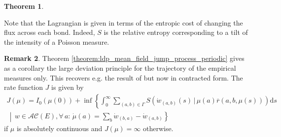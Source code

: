 \documentclass[a4paper]{article}
\newcommand{\cA}{\mathcal{A}}
\newcommand{\cC}{\mathcal{C}}
\newcommand{\cL}{\mathcal{L}}
\newcommand{\bR}{\mathbb{R}}
\newcommand{\dd}{ \mathrm{d}}
\numberwithin{equation}{section}
\newtheorem{theorem}{Theorem}[section]
\theoremstyle{definition}
\newtheorem{remark}[theorem]{Remark}
\begin{document}
\begin{theorem}
\end{theorem}


Note that the Lagrangian is given in terms of the entropic cost of changing the flux across each bond. Indeed, $S$ is the relative entropy corresponding to a tilt of the intensity of a Poisson measure. 

\smallskip


\begin{remark}
	Theorem \ref{theorem:ldp_mean_field_jump_process_periodic} gives as a corollary the large deviation principle for the trajectory of the empirical measures only. This recovers e.g. the result of \cite{Kr16b} but now in contracted form. The rate function $J$ is given by 
	\begin{multline*}
		J(\mu) = I_0(\mu(0)) + \inf \left\{\int_0^\infty \sum_{(a,b) \in \Gamma} S(\dot{w}_{(a,b)}(s) \, | \, \mu(a) \overline{r}(a,b,\mu(s))) \dd s  \right.\\
		\left.  \, \middle| \, w \in \cA\cC(E), \forall \, a: \, \dot{\mu}(a) = \sum_b \dot{w}_{(b,a)} - \dot{w}_{(a,b)} \right\}
	\end{multline*}
	if $\mu$ is absolutely continuous and $J(\mu) = \infty$ otherwise.
\end{remark}
\end{document}
